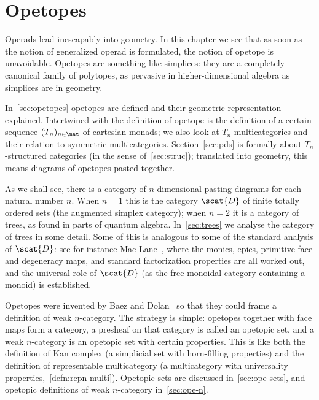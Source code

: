 
\chapter{Opetopes}



\noindent
Operads lead inescapably into geometry.  In this chapter we see that as
soon as the notion of generalized operad is formulated, the notion of
opetope is unavoidable.  Opetopes are something like simplices: they are a
completely canonical family of polytopes, as pervasive in
higher-dimensional algebra as simplices are in geometry.

In~\ref{sec:opetopes} opetopes are defined and their geometric
representation explained.  Intertwined with the definition of opetope is
the definition of a certain sequence $(T_n)_{n\in\nat}$ of cartesian
monads; we also look at $T_n$-multicategories and their relation to
symmetric multicategories.  Section~\ref{sec:pds} is formally about
$T_n$-structured categories (in the sense of~\ref{sec:struc}); translated
into geometry, this means diagrams of opetopes pasted together.

As we shall see, there is a category of $n$-dimensional pasting diagrams
for each natural number $n$.  When $n=1$ this is the category $\scat{D}$%
%
%
of
finite totally ordered sets (the augmented simplex category); when $n=2$ it
is a category of trees, as found in parts of quantum algebra.
In~\ref{sec:trees} we analyse the category of trees in some detail.  Some
of this is analogous to some of the standard analysis of $\scat{D}$: see
for instance Mac Lane~\cite[VII.5]{MacCWM}, where the monics, epics,
primitive face and degeneracy maps, and standard factorization properties
are all worked out, and the universal role of $\scat{D}$ (as the free
monoidal category containing a monoid) is established.

Opetopes were invented by Baez%
%
%
and Dolan~\cite{BDHDA3}%
%
%
so that they could
frame a definition of weak $n$-category.  The strategy is simple: opetopes
together with face maps form a category, a presheaf on that category is
called an opetopic set, and a weak $n$-category is an opetopic set with
certain properties.  This is like both the definition of Kan complex (a
simplicial set with horn-filling properties) and the definition of
representable multicategory (a multicategory with universality
properties,~\ref{defn:repn-multi}).  Opetopic sets are discussed
in~\ref{sec:ope-sets}, and opetopic definitions of weak $n$-category
in~\ref{sec:ope-n}.

